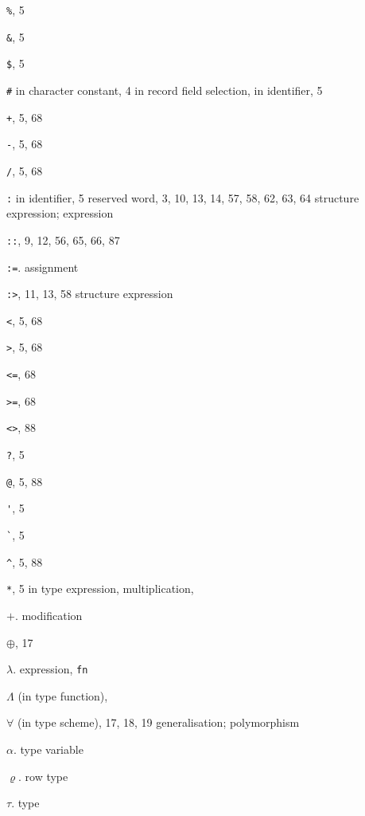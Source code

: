 \begin{theindex}
\item \verb+%+, 5
\item \verb+&+, 5
\item \verb+$+, 5
\item \verb+#+
\subitem in character constant, 4
\subitem in record field selection, \hashrefs
\subitem in identifier, 5
\item \verb(+(, 5, 68
\item \verb+-+, 5, 68
\item \verb+/+, 5, 68
\item \verb+:+ 
\subitem in identifier, 5
\subitem reserved word, 3, 10, 13, 14, 57, 58, 62, 63, 64
\subitem \seealso structure expression; expression
\item \verb+::+, 9, 12, 56, 65, 66, 87
\item \verb+:=+. \see assignment
\item \verb+:>+, 11, 13, 58 
\subitem \seealso structure expression
\item \verb+<+, 5, 68
\item \verb+>+, 5, 68
\item \verb+<=+, 68
\item \verb+>=+, 68
\item \verb+<>+, 88
\item \verb+?+, 5
\item \verb+@+, 5, 88
\item \verb+'+, 5
\item \verb+`+, 5
\item \verb+^+, 5, 88
\item \verb+*+, 5
\subitem in type expression, \startyperefs
\subitem multiplication, \mulrefs
\item $+$. \see modification
\item $\oplus$, 17
\item $\lambda$. \see expression, {\tt fn}
\item $\Lambda$ (in type function), \Lambdarefs
\item $\forall$ (in type scheme), 17, 18, 19
\subitem \seealso generalisation; polymorphism
\item $\alpha$. \see type variable 
\item $\varrho$. \see row type 

\item $\tau$. \see type 


\end{theindex}
